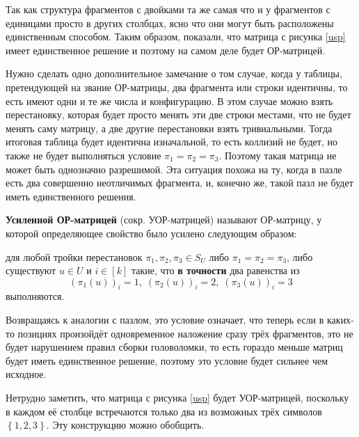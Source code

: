 Так как структура фрагментов с двойками та же самая что и у фрагментов с единицами просто в других столбцах, ясно что они могут быть расположены единственным способом. Таким образом, показали, что матрица с рисунка \ref{usp} имеет единственное решение и поэтому на самом деле будет ОР-матрицей.

Нужно сделать одно дополнительное замечание о том случае, когда у таблицы, претендующей на звание ОР-матрицы, два фрагмента или строки идентичны, то есть имеют одни и те же числа и конфигурацию. В этом случае можно взять перестановку, которая будет просто менять эти две строки местами, что не будет менять саму матрицу, а две другие перестановки взять тривиальными. Тогда итоговая таблица будет идентична изначальной, то есть коллизий не будет, но также не будет выполняться условие $\pi_1=\pi_2=\pi_3$. Поэтому такая матрица не может быть однозначно разрешимой. Эта ситуация похожа на ту, когда в пазле есть два совершенно неотличимых фрагмента, и, конечно же, такой пазл не будет иметь единственного решения.

\begin{definition}
  \textbf{Усиленной ОР-матрицей} (сокр. УОР-матрицей) называют ОР-матрицу, у которой определяющее свойство было усилено следующим образом:
  
  для любой тройки перестановок $\pi_1, \pi_2, \pi_3 \in S_U$ либо $\pi_1=\pi_2=\pi_3$, либо существуют $u \in U$ и $i \in [k]$ такие, что \textbf{в точности} два равенства из 
  \[\left( \pi_1(u) \right)_i = 1,\; \left( \pi_2(u) \right)_i = 2,\; \left( \pi_3(u) \right)_i = 3\]
  выполняются.
\end{definition}

Возвращаясь к аналогии с пазлом, это условие означает, что теперь если в каких-то позициях произойдёт одновременное наложение сразу трёх фрагментов, это не будет нарушением правил сборки головоломки, то есть гораздо меньше матриц будет иметь единственное решение, поэтому это условие будет сильнее чем исходное.

Нетрудно заметить, что матрица с рисунка \ref{usp} будет УОР-матрицей, поскольку в каждом её столбце встречаются только два из возможных трёх символов $\left\{ 1,2,3 \right\}$. Эту конструкцию можно обобщить.


